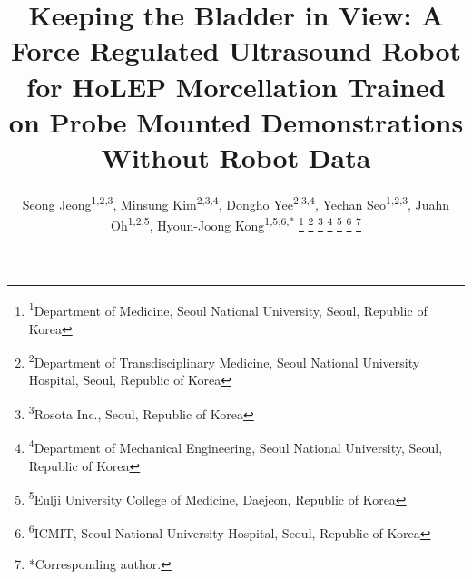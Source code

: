 \documentclass[conference]{IEEEtran}
\begin{document}
\title{Keeping the Bladder in View: A Force Regulated Ultrasound Robot for HoLEP
Morcellation Trained on Probe Mounted Demonstrations Without Robot Data}

\author{%
Seong Jeong\textsuperscript{1,2,3}, Minsung Kim\textsuperscript{2,3,4},
Dongho Yee\textsuperscript{2,3,4}, Yechan Seo\textsuperscript{1,2,3},
Juahn Oh\textsuperscript{1,2,5}, Hyoun-Joong Kong\textsuperscript{1,5,6,*}
\thanks{\textsuperscript{1}Department of Medicine, Seoul National University, Seoul, Republic of Korea}
\thanks{\textsuperscript{2}Department of Transdisciplinary Medicine, Seoul National University Hospital, Seoul, Republic of Korea}
\thanks{\textsuperscript{3}Rosota Inc., Seoul, Republic of Korea}
\thanks{\textsuperscript{4}Department of Mechanical Engineering, Seoul National University, Seoul, Republic of Korea}
\thanks{\textsuperscript{5}Eulji University College of Medicine, Daejeon, Republic of Korea}
\thanks{\textsuperscript{6}ICMIT, Seoul National University Hospital, Seoul, Republic of Korea}
\thanks{*Corresponding author.}}

\maketitle
\end{document}
